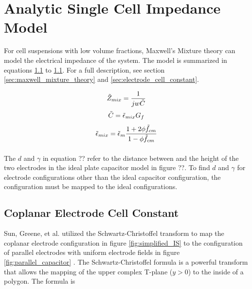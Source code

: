 \label{ch: modeling}






\section{Analytic Single Cell Impedance Model}

\par For cell suspensions with low volume fractions, Maxwell's Mixture theory can model the electrical impedance of the system. The model is summarized in equations \ref{} to \ref{}. For a full description, see section \ref{sec:maxwell_mixture_theory} and \ref{sec:electrode_cell_constant}.

\begin{equation}
    \Tilde{Z}_{mix} = \frac{1}{jw\Tilde{C}}
\end{equation}
\begin{equation}
    \Tilde{C} = \Tilde{\epsilon}_{mix}G_f    
\end{equation}
\begin{equation}
    \Tilde{\epsilon}_{mix} = \Tilde{\epsilon}_m \frac{1 + 2\phi\Tilde{f}_{cm}}{1-\phi\Tilde{f}_{cm}}
\end{equation}
\begin{equation}
\end{equation}

\par The $d$ and $\gamma$ in equation ?? refer to the distance between and the height of the two electrodes in the ideal plate capacitor model in figure ??. To find $d$ and $\gamma$ for electrode configurations other than the ideal capacitor configuration, the configuration must be mapped to the ideal configurations. 

\subsection{Coplanar Electrode Cell Constant}
    \par Sun, Greene, et al. utilized the Schwartz-Christoffel transform to map the coplanar electrode configuration in figure \ref{fig:simplified_IS} to the configuration of parallel electrodes with uniform electrode fields in figure \ref{fig:parallel_capacitor} \cite{sun_analytical_2007}. The Schwartz-Christoffel formula is a powerful transform that allows the mapping of the upper complex T-plane ($y>0$) to the inside of a polygon. The formula is
    
